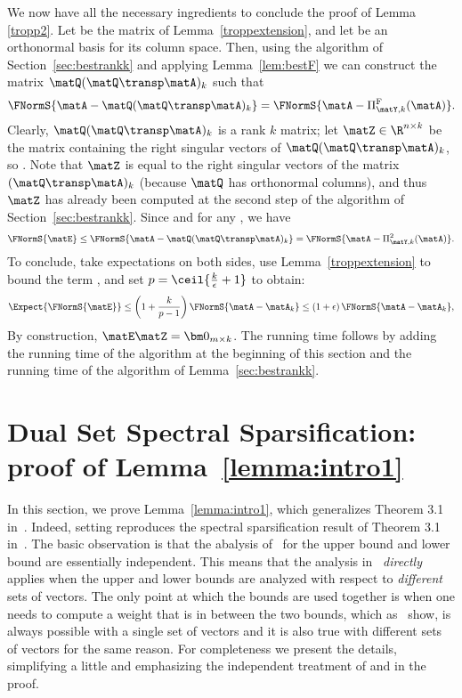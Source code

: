 We now have all the necessary ingredients
to conclude the proof of Lemma \ref{tropp2}. Let \math{\matY} be the matrix of
Lemma~\ref{troppextension},
and let \math{\matQ} be an orthonormal basis for its column
space. Then,
using the algorithm of Section~\ref{sec:bestrankk}
and applying Lemma~\ref{lem:bestF} we can construct the matrix
$\matQ(\matQ\transp\matA)_k$ such that
$$\FNormS{\matA -  \matQ(\matQ\transp\matA)_k} =
\FNormS{\matA - \Pi_{\matY,k}^{\mathrm{F}}(\matA) }.$$
Clearly, $ \matQ(\matQ\transp\matA)_k$ is a rank $k$ matrix; let
$\matZ \in {\R}^{n \times k}$ be
the matrix containing the right singular vectors of
$\matQ(\matQ\transp\matA)_k$, so
.
Note that  $\matZ$ is equal to the right singular vectors of the
matrix $(\matQ\transp\matA)_k$ (because $\matQ$ has orthonormal columns), and thus $\matZ$ has already been computed at the second step
of the algorithm of Section~\ref{sec:bestrankk}.  Since
\math{\matE=\matA - \matA \matZ
\matZ\transp} and
\math{\FNorm{\matA-\matA\matZ\matZ\transp}\le
\FNorm{\matA-\matX\matZ\transp}} for any \math{\matX}, we have
$$\FNormS{\matE} \leq \FNormS{\matA - \matQ(\matQ\transp\matA)_k}
=\FNormS{\matA - \Pi_{\matY,k}^2(\matA) }.$$
To conclude, take expectations on both sides,
use Lemma~\ref{troppextension} to bound the term ,
and set $p = \ceil{ \frac{k}{\epsilon } + 1}$ to obtain:
$$\Expect{\FNormS{\matE}} \leq \left( 1 + \frac{k}{p-1} \right) \FNormS{\matA - \matA_k}
\leq \left(1+\epsilon\right)\FNormS{\matA - \matA_k},$$
By construction,  $\matE\matZ=\bm0_{m\times k}$.
The running time follows by adding the running time of the algorithm at the beginning of this section and the running time of the algorithm of Lemma~\ref{sec:bestrankk}.

\section{Dual Set Spectral Sparsification: proof of  Lemma~\ref{lemma:intro1}} \label{sec:proofpure1}

In this section, we prove Lemma~\ref{lemma:intro1}, which generalizes Theorem 3.1 in~\cite{BSS09}. Indeed, setting
 reproduces the spectral sparsification result of
 Theorem 3.1 in~\cite{BSS09}.
The basic observation is that the abalysis of~\cite{BSS09} for the upper bound
and lower bound are essentially independent. This means that the
analysis in~\cite{BSS09} \emph{directly} applies when the upper and lower
bounds are analyzed with respect to \emph{different} sets of vectors.
The only point at which the bounds are used together is when
one needs to compute a weight that is in between the two bounds, which
as~\cite{BSS09} show, is always possible with a single set of vectors
and it is also true with different sets of vectors for the same reason.
For completeness we present the details, simplifying a little and
emphasizing the independent treatment of  and  in the
proof.


